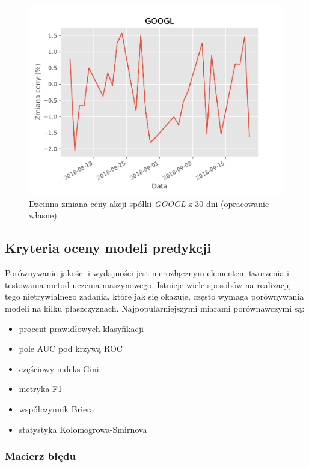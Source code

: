 \documentclass[a4paper, twoside, 11pt, openright]{article}
\begin{document}
\begin{figure}[H]
\centering \includegraphics[scale=0.9]{img/googl_pct_change_last_30}
\caption{Dzeinna zmiana ceny akcji spółki \textit{GOOGL} z 30 dni (opracowanie własne)}
\label{img:googl_pct_change_last_30}
\end{figure}

\subsection{Kryteria oceny modeli predykcji}

Porównywanie jakości i wydajności jest nierozłącznym elementem tworzenia i testowania metod uczenia maszynowego. Istnieje wiele sposobów na realizację tego nietrywialnego zadania, które jak się okazuje, często wymaga porównywania modeli na kilku płaszczyznach. Najpopularniejszymi miarami porównawczymi są:
\begin{itemize}
\item procent prawidłowych klasyfikacji
\item pole AUC pod krzywą ROC
\item częściowy indeks Gini
\item metryka F1
\item współczynnik Briera
\item statystyka Kołomogrowa-Smirnova
\end{itemize}

\subsubsection{Macierz błędu}
\end{document}
